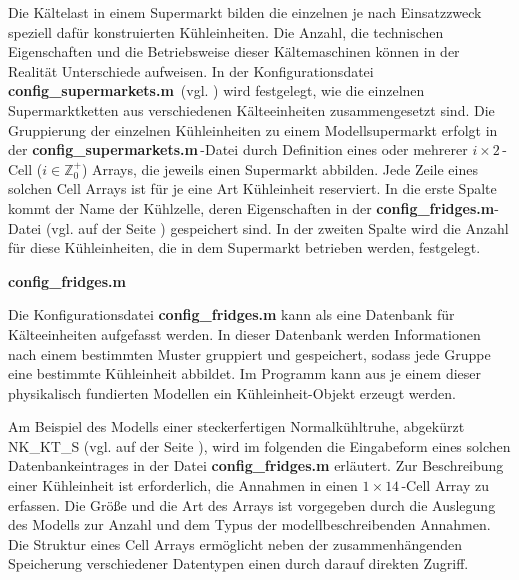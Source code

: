 Die Kältelast in einem Supermarkt bilden die einzelnen je nach Einsatzzweck
speziell dafür konstruierten K\"uhleinheiten. Die Anzahl, die technischen
Eigenschaften und die Betriebsweise dieser Kältemaschinen können in der
Realität Unterschiede aufweisen. In der Konfigurationsdatei
\textbf{config\_supermarkets.m$\,$} (vgl. ) wird festgelegt, wie
die einzelnen Supermarktketten aus verschiedenen Kälteeinheiten zusammengesetzt
sind. Die Gruppierung der einzelnen K\"uhleinheiten zu einem Modellsupermarkt
erfolgt in der \textbf{config\_supermarkets.m$\,$}-Datei durch Definition eines
oder mehrerer $i\times2\,$-Cell ($i\in \mathbb{Z}^+_0$) Arrays, die jeweils
einen Supermarkt abbilden. Jede Zeile eines solchen Cell Arrays ist für je eine
Art K\"uhleinheit reserviert. In die erste Spalte kommt der Name der
K\"uhlzelle, deren Eigenschaften in der \textbf{config\_fridges.m}-Datei (vgl.
 auf der Seite \pageref{fridge}) gespeichert sind. In der zweiten
Spalte wird die Anzahl f\"ur diese K\"uhleinheiten, die in dem Supermarkt
betrieben werden, festgelegt.

\vspace{3mm}%
\noindent\textbf{config\_fridges.m}
\vspace{3mm}

Die Konfigurationsdatei \textbf{config\_fridges.m} kann als eine Datenbank für
Kälteeinheiten aufgefasst werden. In dieser Datenbank werden Informationen nach
einem bestimmten Muster gruppiert und gespeichert, sodass jede Gruppe eine
bestimmte K\"uhleinheit abbildet. Im Programm kann aus je einem dieser
physikalisch fundierten Modellen ein K\"uhleinheit-Objekt erzeugt werden.

Am Beispiel des Modells einer steckerfertigen Normalkühltruhe, abgekürzt
NK\_KT\_S (vgl.  auf der Seite \pageref{fridge}), wird im
folgenden die Eingabeform eines solchen Datenbankeintrages in der Datei
\textbf{config\_fridges.m} erläutert.  Zur Beschreibung einer K\"uhleinheit ist
erforderlich, die Annahmen in einen $1\times14\,$-Cell Array zu erfassen. Die
Größe und die Art des Arrays ist vorgegeben durch die Auslegung des Modells zur
Anzahl und dem Typus der modellbeschreibenden Annahmen. Die Struktur eines Cell
Arrays ermöglicht neben der zusammenhängenden Speicherung verschiedener
Datentypen einen durch \matlab darauf direkten Zugriff.

